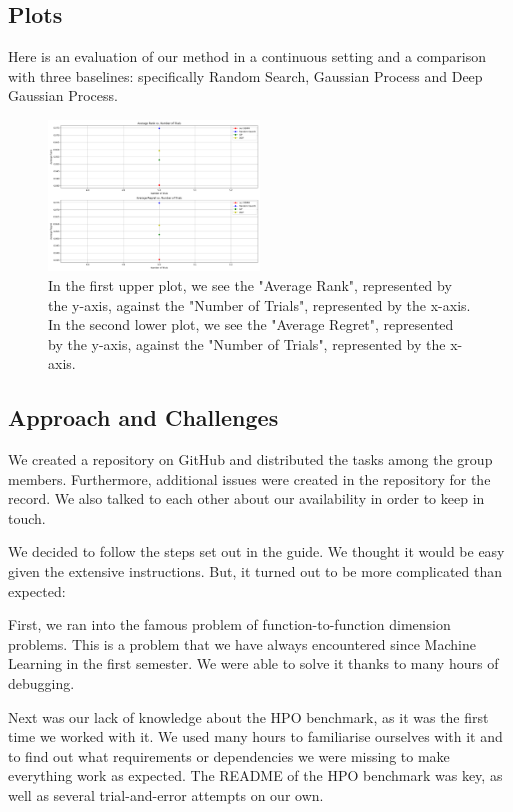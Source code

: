 \documentclass[10pt,a4paper,twocolumn]{article}
\begin{document}
{\subsection{Plots}
Here is an evaluation of our method in a continuous setting and a comparison with three baselines: specifically Random Search, Gaussian Process and Deep Gaussian Process.

\begin{figure}[h]
\includegraphics[width=0.5\textwidth]{img/average_metrics.png}
\caption{In the first upper plot, we see the "Average Rank", represented by the y-axis, against the "Number of Trials", represented by the x-axis. In the second lower plot, we see the "Average Regret", represented by the y-axis, against the "Number of Trials", represented by the x-axis.}
\label{fig:plot}
\end{figure}

\subsection{Approach and Challenges}
We created a repository on GitHub and distributed the tasks among the group members. Furthermore, additional issues were created in the repository for the record. We also talked to each other about our availability in order to keep in touch.

We decided to follow the steps set out in the guide. We thought it would be easy given the extensive instructions. But, it turned out to be more complicated than expected:

First, we ran into the famous problem of function-to-function dimension problems. This is a problem that we have always encountered since Machine Learning in the first semester. We were able to solve it thanks to many hours of debugging. 

Next was our lack of knowledge about the HPO benchmark, as it was the first time we worked with it. We used many hours to familiarise ourselves with it and to find out what requirements or dependencies we were missing to make everything work as expected. The README of the HPO benchmark was key, as well as several trial-and-error attempts on our own.

}
\end{document}
